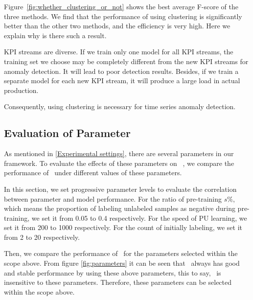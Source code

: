 Figure~\ref{fig:whether_clustering_or_not} shows the best average F-score of the three methods. We find that the performance of using clustering is significantly better than the other two methods, and the efficiency is very high. Here we explain why is there such a result. 

KPI streams are diverse. If we train only one model for all KPI streams, the training set we choose may be completely different from the new KPI streams for anomaly detection. It will lead to poor detection results. Besides, if we train a separate model for each new KPI stream, it will produce a large load in actual production.

Consequently, using clustering is necessary for time series anomaly detection.

\subsection{Evaluation of Parameter}
As mentioned in \ref{Experimental settings}, there are several parameters in our framework. To evaluate the effects of these parameters on \name~, we compare the performance of \name~under different values of these parameters.
\par
In this section, we set progressive parameter levels to evaluate the correlation between parameter and model performance.
For the ratio of pre-training $s\%$, which means the proportion of labeling unlabeled samples as negative during pre-training, we set it from 0.05 to 0.4 respectively. For the speed of PU learning, we set it from 200 to 1000 respectively. For the count of initially labeling, we set it from 2 to 20 respectively.
\par
Then, we compare the performance of \name~for the parameters selected within the scope above.
From figure \ref{fig:parameters} it can be seen that \name~always has good and stable performance by using these above parameters, this to say, \name~is insensitive to these parameters.
Therefore, these parameters can be selected within the scope above.
